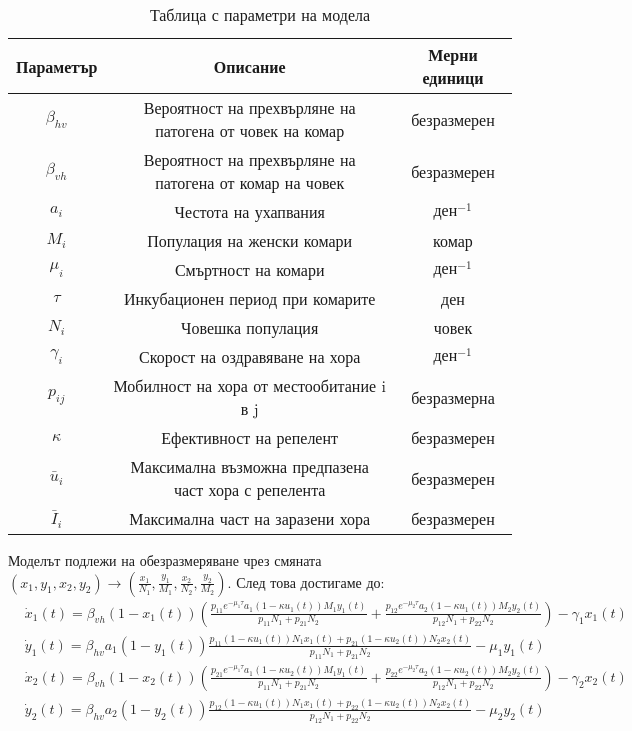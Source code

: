 \begin{table}[h!]
  \centering
  \caption{Таблица с параметри на модела}
  \begin{tabular}{ |c c c|  }
    \hline
    Параметър & Описание & Мерни единици\\
    \hline
    $\beta_{hv}$ & Вероятност на прехвърляне на патогена от човек на комар & безразмерен\\
    $\beta_{vh}$ & Вероятност на прехвърляне на патогена от комар на човек & безразмерен\\
    $a_i$ & Честота на ухапвания & $\text{ден}^{-1}$\\
    $M_i$ & Популация на женски комари & комар\\
    $\mu_i$ & Смъртност на комари & $\text{ден}^{-1}$\\
    $\tau$ & Инкубационен период при комарите & ден\\
    $N_i$ & Човешка популация & човек\\
    $\gamma_i$ & Скорост на оздравяване на хора & $\text{ден}^{-1}$\\
    $p_{ij}$ & Мобилност на хора от местообитание i в j & безразмерна\\
    $\kappa$ & Ефективност на репелент & безразмерен\\
    $\bar{u}_i$ & Максимална възможна предпазена част хора с репелента & безразмерен\\
    $\bar{I}_i$ & Максимална част на заразени хора & безразмерен\\
    \hline
  \end{tabular}
  \label{table:1}
\end{table}

Моделът подлежи на обезразмеряване чрез смяната $(x_1, y_1, x_2, y_2) \rightarrow (\frac{x_1}{N_1}, \frac{y_1}{M_1}, \frac{x_2}{N_2}, \frac{y_2}{M_2})$. След това достигаме до:
\begin{equation}
  \label{eq:TheDimensionlessProblemFull}
  \begin{split}
    &\dot{x}_1(t) = \beta_{vh} (1-x_1(t)) \left(\frac{p_{11} e^{-\mu_1 \tau} a_1 (1-\kappa u_1(t)) M_1 y_1(t)}{p_{11} N_1 + p_{21} N_2} + \frac{p_{12} e^{-\mu_2 \tau} a_2 (1-\kappa u_1(t)) M_2 y_2(t)}{p_{12} N_1 + p_{22} N_2}\right) - \gamma_1 x_1(t) \\
    &\dot{y}_1(t) = \beta_{hv} a_1 (1-y_1(t)) \frac{p_{11} (1-\kappa u_1(t)) N_1 x_1(t) + p_{21} (1-\kappa u_2(t)) N_2 x_2(t)}{p_{11} N_1 + p_{21} N_2} - \mu_1 y_1(t) \\
    &\dot{x}_2(t) = \beta_{vh} (1-x_2(t)) \left(\frac{p_{21} e^{-\mu_1 \tau} a_1 (1-\kappa u_2(t)) M_1 y_1(t)}{p_{11} N_1 + p_{21} N_2} + \frac{p_{22} e^{-\mu_2 \tau} a_2 (1-\kappa u_2(t)) M_2 y_2(t)}{p_{12} N_1 + p_{22} N_2}\right) - \gamma_2 x_2(t) \\
    &\dot{y}_2(t) = \beta_{hv} a_2 (1-y_2(t)) \frac{p_{12} (1-\kappa u_1(t)) N_1 x_1(t) + p_{22} (1-\kappa u_2(t)) N_2 x_2(t)}{p_{12} N_1 + p_{22} N_2} - \mu_2 y_2(t)
  \end{split}
\end{equation}


